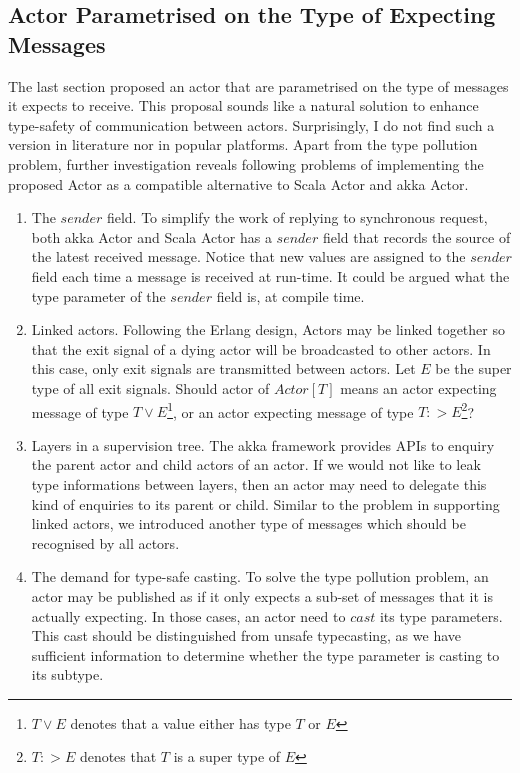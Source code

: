 \subsection{Actor Parametrised on the Type of Expecting Messages}
\label{typed actor}
The last section proposed an actor that are parametrised on the type of messages it expects to receive.  This proposal sounds like a natural solution to enhance type-safety of communication between actors.  Surprisingly, I do not find such a version in literature nor in popular platforms.  Apart from the type pollution problem, further investigation reveals following problems of implementing the proposed Actor as a compatible alternative to Scala Actor and akka Actor.

\begin{enumerate}
\item The $sender$ field.  To simplify the work of replying to synchronous request, both akka Actor and Scala Actor has a $sender$ field that records the source of the latest received message.  Notice that new values are assigned to the $sender$ field each time a message is received at run-time.  It could be argued what the type parameter of the $sender$ field is, at compile time.

\item Linked actors.  Following the Erlang design, Actors may be linked together so that the exit signal of a dying actor will be broadcasted to other actors.  In this case, only exit signals are transmitted between actors.  Let $E$ be the super type of all exit signals.  Should actor of $Actor[T]$ means an actor expecting message of type $T\vee E$\footnote{$T\vee E$ denotes that a value either has type $T$ or $E$}, or an actor expecting message of type $T :> E $\footnote{$T :> E $ denotes that $T$ is a super type of $E$}?

\item Layers in a supervision tree.  The akka framework provides APIs to enquiry the parent actor and child actors of an actor.  If we would not like to leak type informations between layers, then an actor may need to delegate this kind of enquiries to its parent or child.  Similar to the problem in supporting linked actors, we introduced another type of messages which should be recognised by all actors.

\item The demand for type-safe casting.  To solve the type pollution problem, an actor may be published as if it only expects a sub-set of messages that it is actually expecting.  In those cases, an actor need to $cast$ its type parameters.  This cast should be distinguished from unsafe typecasting, as we have sufficient information to determine whether the type parameter is casting to its subtype.

\end{enumerate}

